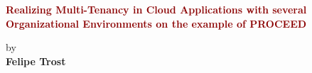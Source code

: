\begin{titlepage}
	\strut
	\hfill
	\begin{center}
	\vspace{1cm}
		\Huge
		\begin{spacing}{.9}
			\textcolor{DarkRed}{\textbf{Realizing Multi-Tenancy in Cloud Applications with
      several Organizational Environments on the example of PROCEED}}\\
		\end{spacing}
		\vspace{0.8cm}
		\large
		by\\
		\vspace{0.8cm}
		\textbf{Felipe Trost}\\
		\vspace{0.8cm}

\end{center}
\end{titlepage}
